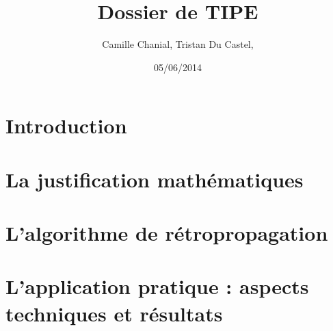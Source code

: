 \documentclass[a4paper, 11pt]{article}
\begin{document}
 
\title{Dossier de TIPE}
\author{Camille Chanial, Tristan Du Castel, }
\date{05/06/2014} 
 
\maketitle

 
\tableofcontents
 

\newpage

\section{Introduction}
\section{La justification mathématiques}
\section{L'algorithme de rétropropagation}
\section{L'application pratique : aspects techniques et résultats}

 
\end{document}
